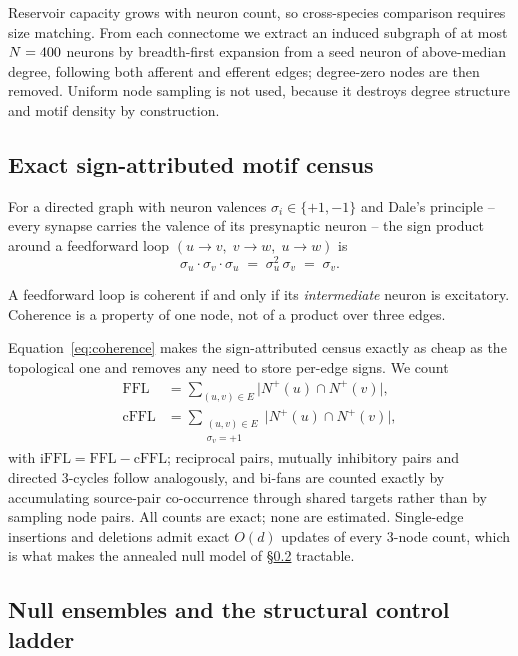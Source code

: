 Reservoir capacity grows with neuron count, so cross-species comparison requires
size matching. From each connectome we extract an induced subgraph of at most
$N = 400$ neurons by breadth-first expansion from a seed neuron of
above-median degree, following both afferent and efferent edges; degree-zero nodes
are then removed. Uniform node sampling is not used, because it destroys degree
structure and motif density by construction.

\subsection{Exact sign-attributed motif census}
\label{sec:census}

For a directed graph with neuron valences $\sigma_i \in \{+1,-1\}$ and Dale's
principle -- every synapse carries the valence of its presynaptic neuron -- the sign
product around a feedforward loop $(u \to v,\; v \to w,\; u \to w)$ is
\begin{equation}
\sigma_u \cdot \sigma_v \cdot \sigma_u \;=\; \sigma_u^2\,\sigma_v \;=\; \sigma_v .
\label{eq:coherence}
\end{equation}

\begin{remark}
A feedforward loop is coherent if and only if its \emph{intermediate} neuron is
excitatory. Coherence is a property of one node, not of a product over three edges.
\end{remark}

Equation~\eqref{eq:coherence} makes the sign-attributed census exactly as cheap as
the topological one and removes any need to store per-edge signs. We count
\begin{align}
\mathrm{FFL} &= \sum_{(u,v) \in E} \big| N^{+}(u) \cap N^{+}(v) \big| ,\\
\mathrm{cFFL} &= \sum_{\substack{(u,v)\in E \\ \sigma_v = +1}} \big| N^{+}(u) \cap N^{+}(v) \big| ,
\end{align}
with $\mathrm{iFFL} = \mathrm{FFL} - \mathrm{cFFL}$; reciprocal pairs, mutually
inhibitory pairs and directed 3-cycles follow analogously, and bi-fans are counted
exactly by accumulating source-pair co-occurrence through shared targets rather than
by sampling node pairs. All counts are exact; none are estimated. Single-edge
insertions and deletions admit exact $O(d)$ updates of every 3-node count, which is
what makes the annealed null model of \S\ref{sec:nulls} tractable.

\subsection{Null ensembles and the structural control ladder}
\label{sec:nulls}


